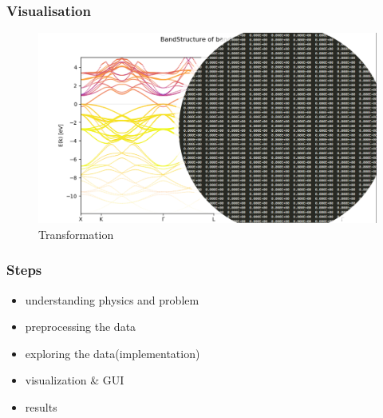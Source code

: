 \begin{frame}[plain]
\frametitle{Visualisation}
\begin{figure}
\includegraphics[scale=0.25]{fig/visual} 
\caption{Transformation}
\end{figure}
\end{frame}

\begin{frame}\frametitle{Steps}
\begin{itemize}
\item understanding physics and problem
\item preprocessing the data
\item exploring the data(implementation)
\item visualization \& GUI
\item results
\end{itemize}
\end{frame}



%